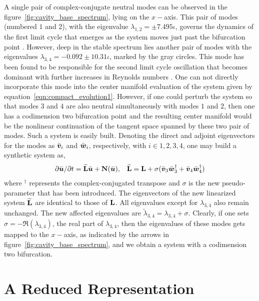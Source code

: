 A single pair of complex-conjugate neutral modes can be observed in the figure~\ref{fig:cavity_base_spectrum}, lying on the $x-$axis. This pair of modes (numbered $1$ and $2$), with the eigenvalue $\lambda_{1,2} = \pm7.495\iota$, governs the dynamics of the first limit cycle that emerges as the system moves just past the bifurcation point \citep{negi24,bengana19}. However, deep in the stable spectrum lies another pair of modes with the eigenvalues $\lambda_{3,4}=-0.092\pm10.31\iota$, marked by the gray circles. This mode has been found to be responsible for the second limit cycle oscillation that becomes dominant with further increases in Reynolds numbers \citep{bengana19}. One can not directly incorporate this mode into the center manifold evaluation of the system given by equation~\ref{eqn:compact_evolution1}. However, if one could perturb the system so that modes $3$ and $4$ are also neutral simultaneously with modes $1$ and $2$, then one has a codimension two bifurcation point and the resulting center manifold would be the nonlinear continuation of the tangent space spanned by these two pair of modes. Such a system is easily built. Denoting the direct and adjoint eigenvectors for the modes as $\bar{\boldsymbol{v}}_{i}$ and $\bar{\boldsymbol{w}}_{i}$, respectively, with $i\in1,2,3,4$, one may build a synthetic system as,
\begin{align}
	\label{eqn:compact_evolution2}
	\partial \bar{\boldsymbol{u}}/\partial t = \widetilde{\mathbf{L}}\bar{\boldsymbol{u}} + \mathbf{N}(\bar{\boldsymbol{u}}), && \widetilde{\mathbf{L}} = \mathbf{L} + \sigma(\bar{\boldsymbol{v}}_{3}\bar{\boldsymbol{w}}^{\dagger}_{3} + \bar{\boldsymbol{v}}_{4}\bar{\boldsymbol{w}}^{\dagger}_{4})
\end{align}
where $^{\dagger}$ represents the complex-conjugated transpose and $\sigma$ is the new pseudo-parameter that has been introduced. The eigenvectors of the new linearized system $\widetilde{\mathbf{L}}$ are identical to those of $\mathbf{L}$. All eigenvalues except for $\lambda_{3,4}$ also remain unchanged. The new affected eigenvalues are $\widetilde{\lambda}_{3,4} = \lambda_{3,4} + \sigma$. Clearly, if one sets $\sigma = -\mathfrak{R}(\lambda_{3,4})$, \ie the real part of $\lambda_{3,4}$, then the eigenvalues of these modes gets mapped to the $x-$axis, as indicated by the arrows in figure~\ref{fig:cavity_base_spectrum}, and we obtain a system with a codimension two bifurcation.


\section{A Reduced Representation}
\label{sec:center_manifold}

